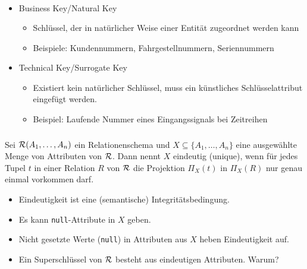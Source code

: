 \begin{frame}\frametitle{\insertsection}
	\framesubtitle{\insertsubsection}
	\\[8pt]
	\begin{itemize}
		\item Business Key/Natural Key
		\begin{itemize}
			\item Schlüssel, der in natürlicher Weise einer Entität zugeordnet werden kann 
			\item Beispiele: Kundennummern, Fahrgestellnummern, Seriennummern\\[8pt]
		\end{itemize}
		\item Technical Key/Surrogate Key
		\begin{itemize}
			\item Existiert kein natürlicher Schlüssel, muss ein künstliches Schlüsselattribut eingefügt werden.
			\item Beispiel: Laufende Nummer eines Eingangssignals bei Zeitreihen
		\end{itemize}
	\end{itemize}
\end{frame}

\begin{frame}\frametitle{\insertsection}
\framesubtitle{\insertsubsection}
\onslide
\begin{definition}\label{unique-attr}
	Sei $\mathcal{R}(A_1,\ldots, A_n)$ ein Relationenschema und $X\subseteq \{A_1,\ldots, A_n\}$ eine ausgew\"ahlte 
	Menge von Attributen von $\mathcal{R}$. Dann nennt $X$ eindeutig (unique), wenn f\"ur jedes 
	Tupel $t$ in einer Relation $R$ von $\mathcal{R}$ die Projektion $\Pi_X(t)$ in $\Pi_X(R)$ nur genau einmal 
	vorkommen darf.
\end{definition}
\pause
\abs
\begin{itemize}
	\item Eindeutigkeit ist eine (semantische) Integrit\"atsbedingung.
	\item Es kann \texttt{null}-Attribute in $X$ geben.
	\item Nicht gesetzte Werte (\texttt{null}) in Attributen aus $X$ heben Eindeutigkeit auf.
	\item Ein Superschl\"ussel von $\mathcal{R}$ besteht aus eindeutigen Attributen. Warum?
\end{itemize}
\end{frame} 

